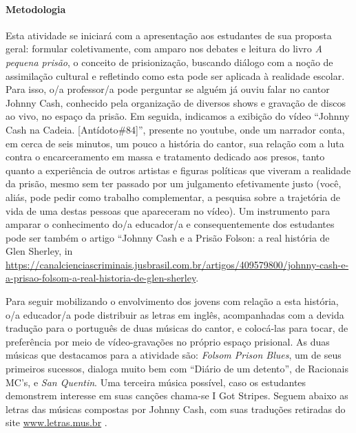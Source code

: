 \documentclass[11pt]{extarticle}
\begin{document}
\paragraph{Metodologia} Esta atividade se iniciará com a apresentação aos
estudantes de sua proposta geral: formular coletivamente, com amparo nos
debates e leitura do livro \emph{A pequena prisão}, o conceito de
prisionização, buscando diálogo com a noção de assimilação cultural e
refletindo como esta pode ser aplicada à realidade escolar. Para isso,
o/a professor/a pode perguntar se alguém já ouviu falar no cantor Johnny
Cash, conhecido pela organização de diversos shows e gravação de discos
ao vivo, no espaço da prisão. Em seguida, indicamos a exibição do vídeo
``Johnny Cash na Cadeia. {[}Antídoto\#84{]}'', presente no youtube, onde
um narrador conta, em cerca de seis minutos, um pouco a história do
cantor, sua relação com a luta contra o encarceramento em massa e
tratamento dedicado aos presos, tanto quanto a experiência de outros
artistas e figuras políticas que viveram a realidade da prisão, mesmo
sem ter passado por um julgamento efetivamente justo (você, aliás, pode
pedir como trabalho complementar, a pesquisa sobre a trajetória de vida
de uma destas pessoas que apareceram no vídeo). Um instrumento para
amparar o conhecimento do/a educador/a e consequentemente dos estudantes
pode ser também o artigo ``Johnny Cash e a Prisão Folson: a real
história de Glen Sherley, in
\href{canalcienciascriminais}{\url{https://canalcienciascriminais.jusbrasil.com.br/artigos/409579800/johnny-cash-e-a-prisao-folsom-a-real-historia-de-glen-sherley}}.

Para seguir mobilizando o envolvimento dos jovens com relação a esta
história, o/a educador/a pode distribuir as letras em inglês,
acompanhadas com a devida tradução para o português de duas músicas do
cantor, e colocá-las para tocar, de preferência por meio de
vídeo-gravações no próprio espaço prisional. As duas músicas que
destacamos para a atividade são: \emph{Folsom Prison Blues}, um de seus
primeiros sucessos, dialoga muito bem com ``Diário de um detento'', de
Racionais MC's, e \emph{San Quentin}. Uma terceira música possível, caso
os estudantes demonstrem interesse em suas canções chama-se I Got
Stripes. Seguem abaixo as letras das músicas compostas por Johnny Cash,
com suas traduções retiradas do site
\href{http://www.letras.mus.br/}{{www.letras.mus.br}} .
\end{document}
